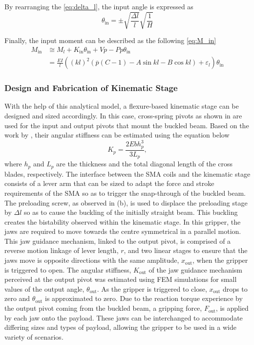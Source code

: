 By rearranging the \cref{eq:delta_l}, the input angle is expressed as
\begin{equation}\label{eq:theta_in}
 {\theta}_\textrm{in}=\pm \sqrt{\frac{\Delta l}{l}}\sqrt{\frac{1}{H}}
\end{equation}

Finally, the input moment can be described as the following \cref{eq:M_in}
\begin{equation}
\begin{split}
 M_\textrm{in} &\cong M_l+K_\textrm{in}{\theta }_\textrm{in}+Vp-Pp{\theta}_\textrm{in}\\
 &=\frac{EI}{l}\left({\left(kl\right)}^2\left(\overline{p}\left(C-1\right)-A\sin{kl}-B\cos{kl}\right)+{\varepsilon }_l\right){\theta}_\textrm{in}
 \label{eq:M_in}
\end{split}
\end{equation}

\subsubsection{Design and Fabrication of Kinematic Stage}
With the help of this analytical model, a flexure-based kinematic stage can be designed and sized accordingly. In this case, cross-spring pivots as shown in \todocite are used for the input and output pivots that mount the buckled beam. Based on the work by \todocite, their angular stiffness can be estimated using the equation below
\begin{equation}
    K_p = \frac{2Ebh_p^3}{3L_p},
\end{equation}
where $h_p$ and $L_p$ are the thickness and the total diagonal length of the cross blades, respectively. The interface between the SMA coils and the kinematic stage consists of a lever arm that can be sized to adapt the force and stroke requirements of the SMA so as to trigger the snap-through of the buckled beam. The preloading screw, as observed in \todocite (b), is used to displace the preloading stage by $\Delta l$ so as to cause the buckling of the initially straight beam. This buckling creates the bistability observed within the kinematic stage. In this gripper, the jaws are required to move towards the centre symmetrical in a parallel motion. This jaw guidance mechanism, linked to the output pivot, is comprised of a reverse motion linkage of lever length, $r$, and two linear stages to ensure that the jaws move is opposite directions with the same amplitude, $x_\textrm{out}$, when the gripper is triggered to open. The angular stiffness, $K_\textrm{out}$ of the jaw guidance mechanism perceived at the output pivot was estimated using FEM simulations for small values of the output angle, $\theta_\mathrm{out}$. As the gripper is triggered to close, $x_\textrm{out}$ drops to zero and $\theta_\mathrm{out}$ is approximated to zero. Due to the reaction torque experience by the output pivot coming from the buckled beam, a gripping force, $F_\textrm{out}$, is applied by each jaw onto the payload. These jaws can be interchanged to accommodate differing sizes and types of payload, allowing the gripper to be used in a wide variety of scenarios.

